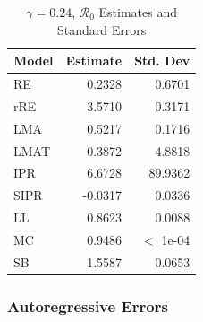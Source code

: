 \documentclass[12pt]{article}
\newcommand{\rr}{\ensuremath{\mathcal{R}_0}}
\begin{document}
\begin{table}[H]
	
	\centering
	\begin{tabular}[t]{l|r|r}
		\hline
		Model & Estimate & Std. Dev\\
		\hline
		RE & 0.2328 & 0.6701\\
		\hline
		rRE & 3.5710 & 0.3171\\
		\hline
		LMA & 0.5217 & 0.1716\\
		\hline
		LMAT & 0.3872 & 4.8818\\
		\hline
		IPR & 6.6728 & 89.9362\\
		\hline
		SIPR & -0.0317 & 0.0336\\
		\hline
		LL & 0.8623 & 0.0088\\
		\hline
		MC & 0.9486 & $<$ 1e-04\\
		\hline
		SB & 1.5587 & 0.0653\\
		\hline
	\end{tabular}
	\caption{$\gamma = 0.24$, $\rr$ Estimates and Standard Errors}
\end{table}

\subsubsection{Autoregressive Errors}
\end{document}
